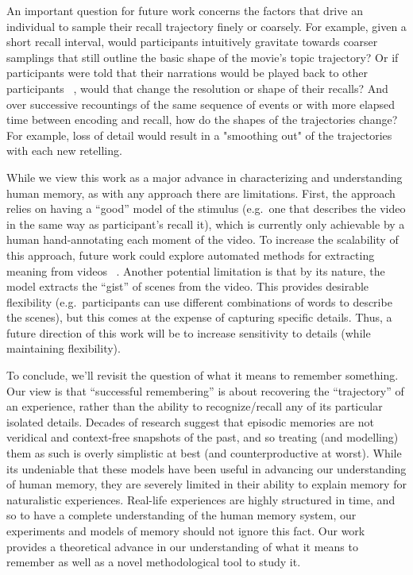 \documentclass{article}
\begin{document}
An important question for future work concerns the factors that drive an individual to sample their recall trajectory finely or coarsely. For example, given a short recall interval, would participants intuitively gravitate towards coarser samplings that still outline the basic shape of the movie's topic trajectory? Or if participants were told that their narrations would be played back to other participants ~\citep{ZadbEtal17}, would that change the resolution or shape of their recalls? And over successive recountings of the same sequence of events or with more elapsed time between encoding and recall, how do the shapes of the trajectories change? For example, loss of detail would result in a "smoothing out" of the trajectories with each new retelling.

While we view this work as a major advance in characterizing and understanding human memory, as with any approach there are limitations. First, the approach relies on having a ``good'' model of the stimulus (e.g.\ one that describes the video in the same way as participant's recall it), which is currently only achievable by a human hand-annotating each moment of the video.  To increase the scalability of this approach, future work could explore automated methods for extracting meaning from videos ~\citep{YuEtal16}.  Another potential limitation is that by its nature, the model extracts the ``gist'' of scenes from the video.  This provides desirable flexibility (e.g.\ participants can use different combinations of words to describe the scenes), but this comes at the expense of capturing specific details.  Thus, a future direction of this work will be to increase sensitivity to details (while maintaining flexibility).

To conclude, we'll revisit the question of what it means to remember something. Our view is that ``successful remembering'' is about recovering the ``trajectory'' of an experience, rather than the ability to recognize/recall any of its particular isolated details. Decades of research suggest that episodic memories are not veridical and context-free snapshots of the past, and so treating (and modelling) them as such is overly simplistic at best (and counterproductive at worst). While its undeniable that these models have been useful in advancing our understanding of human memory, they are severely limited in their ability to explain memory for naturalistic experiences. Real-life experiences are highly structured in time, and so to have a complete understanding of the human memory system, our experiments and models of memory should not ignore this fact. Our work provides a theoretical advance in our understanding of what it means to remember as well as a novel methodological tool to study it.
\end{document}
